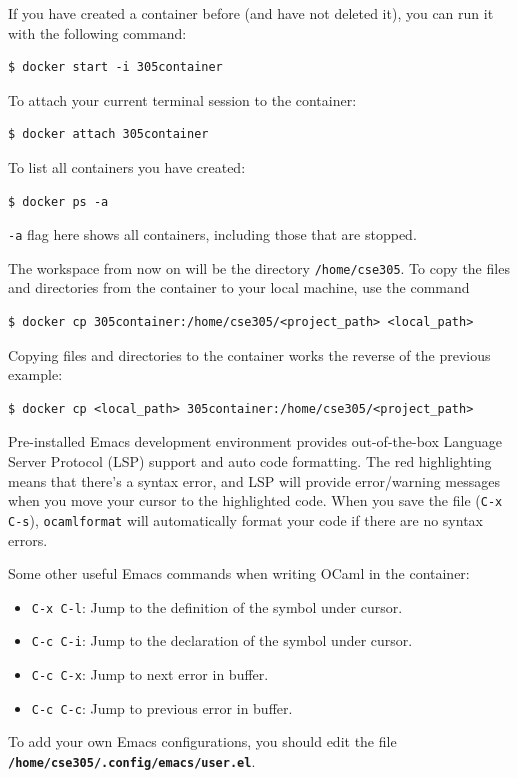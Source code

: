 \documentclass{extarticle}
\begin{document}
If you have created a container before (and have not deleted it), you can run it with the following command:
\begin{lstlisting}
$ docker start -i 305container
\end{lstlisting}

To attach your current terminal session to the container:
\begin{lstlisting}
$ docker attach 305container
\end{lstlisting}

To list all containers you have created:
\begin{lstlisting}
$ docker ps -a
\end{lstlisting}
\texttt{-a} flag here shows all containers, including those that are stopped.

The workspace from now on will be the directory \texttt{/home/cse305}. To copy the files and directories from the container to your local machine, use the command
\begin{lstlisting}
$ docker cp 305container:/home/cse305/<project_path> <local_path>
\end{lstlisting}
Copying files and directories to the container works the reverse of the previous example:
\begin{lstlisting}
$ docker cp <local_path> 305container:/home/cse305/<project_path>
\end{lstlisting}

Pre-installed Emacs development environment provides out-of-the-box
Language Server Protocol (LSP) support and auto code formatting.
The red highlighting means that there's a syntax error, and LSP will provide
error/warning messages when you move your cursor to the highlighted code.
When you save the file (\texttt{C-x C-s}), \texttt{ocamlformat} will
automatically format your code if there are no syntax errors.

Some other useful Emacs commands when writing OCaml in the container:
\begin{itemize}
  \item \texttt{C-x C-l}: Jump to the definition of the symbol under cursor.
  \item \texttt{C-c C-i}: Jump to the declaration of the symbol under cursor.
  \item \texttt{C-c C-x}: Jump to next error in buffer.
  \item \texttt{C-c C-c}: Jump to previous error in buffer.
\end{itemize}

To add your own Emacs configurations, you should edit the file \textbf{\texttt{/home/cse305/.config/emacs/user.el}}.
\end{document}
